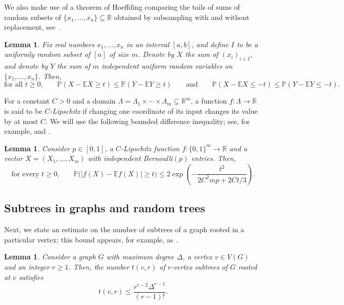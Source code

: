 \documentclass[reqno,a4paper]{amsart}
\newtheorem{lemma}[theorem]{Lemma}
\theoremstyle{definition}
\begin{document}
We also make use of a theorem of Hoeffding comparing the tails of sums of random subsets of $\{x_1,\ldots,x_n\}\subseteq \mathbb R$ obtained by subsampling with and without replacement, see~\cite[Section~6]{Hoe63}. 

\begin{lemma}\label{lem:Hoeffding}
Fix real numbers $x_1,\ldots,x_n$ in an interval $[a,b]$, and define $I$ to be a uniformly random subset of $[n]$ of size $m$. 
Denote by $X$ the sum of $(x_i)_{i\in I}$, and denote by $Y$ the sum of $m$ independent uniform random variables on $\{x_1,\ldots,x_n\}$. Then,
\[\text{for all $t\ge 0$,}\qquad \mathbb P(X-\mathbb E X\ge t)\le \mathbb P(Y-\mathbb E Y\ge t)\qquad \text{and}\qquad \mathbb P(X-\mathbb E X\le -t)\le \mathbb P(Y-\mathbb E Y\le -t).\]
\end{lemma}

For a constant $C>0$ and a domain $\Lambda=\Lambda_1\times\cdots\times\Lambda_m\subseteq\mathbb R^m$, a function $f:\Lambda\to\mathbb R$ is said to be \emph{$C$-Lipschitz} if changing one coordinate of its input changes its value by at most $C$.
We will use the following bounded difference inequality; see, for example, \cite[Theorem 3.9]{M98} and \cite[Corollary 6]{War16}.
\begin{lemma}\label{azuma}
Consider $p\in [0,1]$, a $C$-Lipschitz function $f:\{0,1\}^m\to\mathbb R$ and a vector $X=(X_1,\ldots,X_m)$ with independent Bernoulli$(p)$ entries. Then,
\[
\text{for every $t\ge0$,}\qquad \mathbb P\big(|f(X)-\mathbb E f(X)|\ge t\big)
\le 2\exp\left(-\frac{t^2}{2C^2mp+2Ct/3}\right).
\]
\end{lemma}

\subsection{Subtrees in graphs and random trees}
Next, we state an estimate on the number of subtrees of a graph rooted in a particular vertex; this bound appears, for example, as \cite[Lemma 2]{BFM98}.

\begin{lemma}\label{l: trees}
Consider a graph $G$ with maximum degree $\Delta$, a vertex $v\in V(G)$ and an integer $r\ge1$. Then, the number $t(v,r)$ of $r$-vertex subtrees of $G$ rooted at $v$ satisfies
\[
    t(v,r)\le \frac{r^{r-2}\Delta^{r-1}}{(r-1)!}.
\]
\end{lemma}
\end{document}
